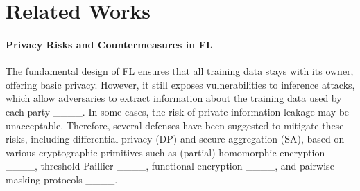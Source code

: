 \section{Related Works}


\paragraph{Privacy Risks and Countermeasures in FL}

The fundamental design of FL ensures that all training data stays with its owner, offering basic privacy. However, it still exposes vulnerabilities to inference attacks, which allow adversaries to extract information about the training data used by each party ____. In some cases, the risk of private information leakage may be unacceptable. Therefore, several defenses have been suggested to mitigate these risks, including differential privacy (DP) and secure aggregation (SA), based on various cryptographic primitives such as (partial) homomorphic encryption ____, threshold Paillier ____, functional encryption ____, and pairwise masking protocols ____. 




